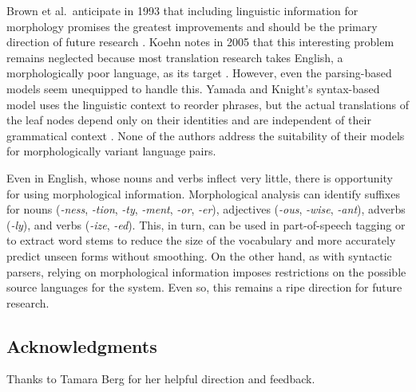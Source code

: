 \documentclass[11pt]{article}
\begin{document}
Brown et al.\ anticipate in 1993 that including linguistic information for morphology 
promises the greatest improvements and should be the primary direction of future research \cite{brown:93}. 
Koehn notes in 2005 that this interesting problem remains neglected because most translation research takes
English, a morphologically poor language, as its target \cite{europarl}.
However, even the parsing-based models seem unequipped to handle this.
Yamada and Knight's syntax-based model uses the linguistic context to reorder phrases,
but the actual translations of the leaf nodes depend only on their identities and are
independent of their grammatical context \cite{yamada_knight}.
None of the authors address the suitability of their models for morphologically variant
language pairs.

Even in English, whose nouns and verbs inflect very little, there is opportunity for using morphological information.
Morphological analysis can identify suffixes for nouns (\textit{-ness}, \textit{-tion}, \textit{-ty}, 
\textit{-ment}, \textit{-or}, \textit{-er}), adjectives (\textit{-ous}, \textit{-wise}, \textit{-ant}), adverbs (\textit{-ly}),
and verbs (\textit{-ize}, \textit{-ed}). This, in turn, can be used in part-of-speech tagging or to 
extract word stems to reduce the size of the vocabulary and more accurately predict unseen forms
without smoothing. On the other hand, as with syntactic parsers, relying on morphological
information imposes restrictions on the possible source languages for the system.
Even so, this remains a ripe direction for future research.

\subsection*{Acknowledgments}
Thanks to Tamara Berg for her helpful direction and feedback.

\printbibliography
\end{document}
